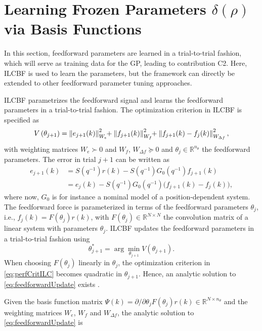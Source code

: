 \documentclass[letterpaper, 10 pt, conference]{ieeeconf}  %
\begin{document}
\section{Learning Frozen Parameters $\delta(\rho)$ via Basis Functions}
\label{sec:ILCBF}
In this section, feedforward parameters are learned in a trial-to-trial fashion, which will serve as training data for the GP, leading to contribution C2. Here, ILCBF is used to learn the parameters, but the framework can directly be extended to other feedforward parameter tuning approaches. \par
ILCBF parametrizes the feedforward signal and learns the feedforward parameters in a trial-to-trial fashion. The optimization criterion in ILCBF is specified as \cite{Bolder2014}
\begin{equation}
	\label{eq:perfCritILC}
	\footnotesize
	V\left({\theta}_{j+1}\right)=\left\|e_{j+1}(k)\right\|_{W_{e}}^{2}\!\!+\left\|f_{j+1}(k)\right\|_{W_{f}}^{2}\!\!+\left\|f_{j+1}(k)-f_{j}(k)\right\|_{W_{\Delta f}}^{2},
\end{equation}
with weighting matrices $W_e \succ 0$ and $W_f$, $W_{\Delta f}\succeq 0$ and $\theta_j\in\mathbb{R}^{n_\theta}$ the feedforward parameters. The error in trial $j+1$ can be written as
\begin{equation}
	\label{eq:errorj+1_2}
	\begin{split}
		e_{j+1}(k) &= S(q^{-1})r(k)-S(q^{-1})G_0(q^{-1}) f_{j+1}(k)\\
		&= e_j(k) - S(q^{-1})G_0(q^{-1})\Big(f_{j+1}(k)-f_j(k)\Big),
	\end{split}
\end{equation}
where now, $G_0$ is for instance a nominal model of a position-dependent system. The feedforward force is parameterized in terms of the feedforward parameters $\theta_j$, i.e., $f_j(k)=F(\theta_j)r(k)$, with $F(\theta_j) \in \mathbb{R}^{N\times N}$ the convolution matrix of a linear system with parameters $\theta_j$. ILCBF updates the feedforward parameters in a trial-to-trial fashion using
\begin{equation}
	\label{eq:feedforwardUpdate}
	{\theta}_{j+1}^* = \arg \min_{{\theta}_{j+1}} V\left({\theta}_{j+1}\right).
\end{equation}
When choosing $F(\theta_j)$ linearly in $\theta_j$, the optimization criterion in \eqref{eq:perfCritILC} becomes quadratic in $\theta_{j+1}$. Hence, an analytic solution to \eqref{eq:feedforwardUpdate} exists \cite{Bolder2015}. \par
Given the basis function matrix $\Psi(k)=\partial/\partial {\theta}_jF(\theta_j)r(k) \in \mathbb{R}^{N\times n_\theta}$ and the weighting matrices $W_e$, $W_f$ and $W_{\Delta f}$, the analytic solution to \eqref{eq:feedforwardUpdate} is
\end{document}
